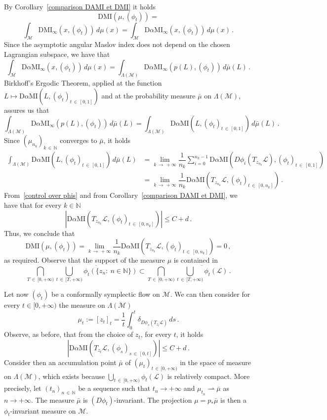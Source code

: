 \documentclass[AHL, Unicode, longabstracts, published]{cedram}
\newcommand*\M{\mathcal{M}}
\newcommand*\cl{\mathcal{L}}
\newcommand{\DMI}{\mathrm{DMI}}
\newcommand{\MI}{\mathrm{MI}}
\newcommand{\rmD}{\mathrm{D}}
\newcommand*\N{\mathbb{N}}
\begin{document}
By Corollary~\ref{comparison DAMI et DMI} it holds
\[
\DMI(\mu,(\phi_t))=
\]
\[
\int_{\M}\DMI_\infty(x, (\phi_t))\, d\mu(x) = \int_\M \rmD\alpha\MI_\infty(x, (\phi_t))\, d\mu(x) \,.
\]
Since the asymptotic angular Maslov index does not depend on the chosen Lagrangian subspace, we have that
\[
\int_\M \rmD\alpha\MI_\infty(x, (\phi_t))\, d\mu(x)=\int_{\Lambda(\M)} \rmD\alpha\MI_\infty(p(L), (\phi_t))\, d\bar\mu(L)\,.
\]
Birkhoff's Ergodic Theorem, applied at the function $L\mapsto \rmD\alpha\MI(L,(\phi_t)_{t\,\in\,[0,1]})$ and at the probability measure $\bar\mu$ on $\Lambda(\M)$, assures us that
\[
\int_{\Lambda(\M)} \rmD\alpha\MI_\infty(p(L), (\phi_t))\, d\bar\mu(L)=\int_{\Lambda(\M)}\rmD\alpha\MI\left(L,(\phi_t)_{t\,\in\,[0,1]}\right)\, d\bar\mu (L)\,.
\]
Since $(\mu_{n_k})_{k\,\in\,\N}$ converges to $\bar\mu$, it holds
\begin{align*}
\int_{\Lambda(\M)}\rmD\alpha\MI\left(L,(\phi_t)_{t\,\in\,[0,1]}\right)\, d\bar\mu (L)&=\lim_{k\,\to\,+\infty}\dfrac{1}{n_k}\sum_{i=0}^{n_k-1}\rmD\alpha\MI\left(D\phi_i\left(T_{z_{n_k}}\cl\right),(\phi_t)_{t\,\in\,[0,1]}\right)\\
&=
\lim_{k\,\to\,+\infty}\dfrac{1}{n_k}\rmD\alpha\MI\left(T_{z_{n_k}}\cl,(\phi_t)_{t\,\in\,[0,n_k]}\right)\,.
\end{align*}
From~\eqref{control over phis} and from Corollary~\ref{comparison DAMI et DMI}, we have that for every $k\in\N$
\[
\left\vert \rmD\alpha\MI\left(T_{z_{n_k}}\cl,(\phi_t)_{t\,\in\,[0,n_k]}\right)\right\vert \leq C+d\,.
\]
Thus, we conclude that
\[
\DMI(\mu,(\phi_t))=\lim_{k\,\to\,+\infty}\dfrac{1}{n_k}\rmD\alpha\MI\left(T_{z_{n_k}}\cl,(\phi_t)_{t\,\in\,[0,n_k]}\right)=0\,,
\]
as required. Observe that the support of the measure $\mu$ is contained in
\[
\displaystyle{\bigcap_{T\,\in\,[0, +\infty)}\overline{\bigcup_{t\,\in\,[T, +\infty)}\phi_t(\{ z_n :\ n\in\N \})}}\subset \displaystyle{\bigcap_{T\,\in\,[0, +\infty)}\overline{\bigcup_{t\,\in\,[T, +\infty)}\phi_t(\cl)}}\,.
\]



Let now $(\phi_t) $ be a conformally symplectic flow on $\M$. We can then consider for every $t\in[0,+\infty)$ the measure on $\Lambda(\M)$
\begin{equation}\label{def mu_t}
\mu_t:=[z_t]_t=\frac 1 t \int_0^t\delta_{D\phi_s\left(T_{z_t}\cl\right)}\, ds\,.
\end{equation}
Observe, as before, that from the choice of $z_t$, for every $t$, it holds
\begin{equation}\label{property z_t}
\left\vert \rmD\alpha\MI\left(T_{z_t}\cl,(\phi_s)_{s\,\in\,[0,t]}\right)\right\vert \leq C+d\,.
\end{equation}
Consider then an accumulation point $\bar \mu$ of $(\mu_t)_{t\,\in\,[0,+\infty)}$ in the space of measure on $\Lambda(\M)$, which exists because $\bigcup_{t\,\in\,[0,+\infty)}\phi_t(\cl)$ is relatively compact. More precisely, let $(t_n)_{n\,\in\,\N}$ be a sequence such that $t_n\to+\infty$ and $\mu_{t_n}\rightharpoonup\bar\mu$ as $n\to+\infty$. The measure $\bar\mu$ is $(D\phi_t)$-invariant. The projection {$\mu=p_*\bar\mu$} is then a $\phi_t$-invariant measure on $\M$.
\end{document}
